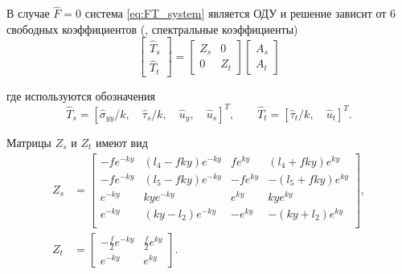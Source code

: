 В случае $\hat{F} = 0$ система \eqref{eq:FT_system} является ОДУ и решение зависит от 6 свободных коэффициентов (\cite{Siebrits_Peirce_2002}, спектральные коэффициенты)
\begin{equation}
    \label{eq:fourier_solution}
    \left[
    \begin{array}{c}
        \hat{T}_s \\
        \hat{T}_t 
    \end{array}
    \right]
    =
    \left[
    \begin{array}{cc}
        Z_s & 0 \\
        0 & Z_t 
    \end{array}
    \right]
    \left[
    \begin{array}{c}
        A_s \\
        A_t 
    \end{array}
    \right]
\end{equation}

где используются обозначения
\begin{equation}
    \label{eq:FourierSeparateT}
    \hat{T}_s = \left[\hat{\sigma}_{yy}/k, \quad \hat{\tau}_s/k, \quad \hat{u}_y, \quad \hat{u}_s \right]^T, \qquad 
    \hat{T}_t = \left[ \hat{\tau}_t/k, \quad  \hat{u}_t \right]^T.
\end{equation}

Матрицы $Z_s$ и $Z_t$ имеют вид
\begin{equation}
    \label{eq:FourierSeparateA}
    \begin{split}
    Z_s & = 
    \left[
    \begin{array}{cccc}
        -fe^{-ky} & (l_4-fky)e^{-ky} & fe^{ky} & (l_4+fky)e^{ky} \\
        -fe^{-ky} & (l_5-fky)e^{-ky} & -fe^{ky} & -(l_5+fky)e^{ky} \\
        e^{-ky} & kye^{-ky} & e^{ky} & kye^{ky} \\
        e^{-ky} & (ky-l_2)e^{-ky} & -e^{ky} & -(ky+l_2)e^{ky} \\
    \end{array}
    \right],
    \\
    Z_t & = 
    \left[
    \begin{array}{cc}
        -\frac{f}{2}e^{-ky} & \frac{f}{2}e^{ky} \\
        e^{-ky} & e^{ky}
    \end{array}
    \right].
    \end{split}
\end{equation}

